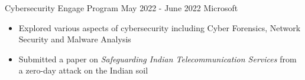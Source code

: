\excventry
{Cybersecurity Engage Program}
{May 2022 - June 2022}
{Microsoft}
{
  \begin{itemize}
    \item Explored various aspects of cybersecurity including Cyber Forensics, Network Security and Malware Analysis
    \item Submitted a paper on \textit{Safeguarding Indian Telecommunication Services} from a zero-day attack on the Indian soil
  \end{itemize}
}

